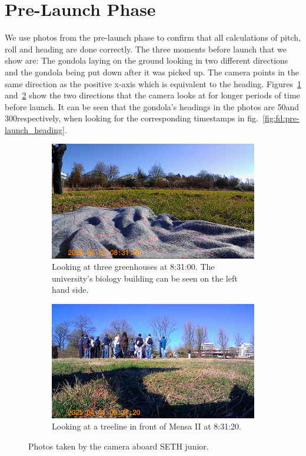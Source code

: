 \section{Pre-Launch Phase \label{sec:pre-launch_phase}}
We use photos from the pre-launch phase to confirm that all calculations of pitch, roll and heading are done correctly. The three moments before launch that we show are: The gondola laying on the ground looking in two different directions and the gondola being put down after it was picked up. The camera points in the same direction as the positive x-axis which is equivalent to the heading. Figures~\ref{fig:fd:apeman_50} and~\ref{fig:fd:apeman_300} show the two directions that the camera looks at for longer periods of time before launch. It can be seen that the gondola's headings in the photos are 50\deg and 300\deg respectively, when looking for the corresponding timestamps in fig.~\ref{fig:fd:pre-launch_heading}.

\begin{figure}[h]
\begin{subfigure}[t]{.4999\textwidth}
  \centering
  \includegraphics[width=.9\linewidth]{images/05_flight_data/apeman_50_8_31_00.png}
  \caption{Looking at three greenhouses at 8:31:00. The university's biology building can be seen on the left hand side.}
  \label{fig:fd:apeman_50}
\end{subfigure}
\begin{subfigure}[t]{.4999\textwidth}
  \centering
  \includegraphics[width=.9\linewidth]{images/05_flight_data/apeman_300_8_31_20.png}
  \caption{Looking at a treeline in front of Mensa II at 8:31:20.}
  \label{fig:fd:apeman_300}
\end{subfigure}
\caption{Photos taken by the camera aboard \ac{SETH} junior.}
\label{fig:fd:apeman_headings}
\end{figure}

